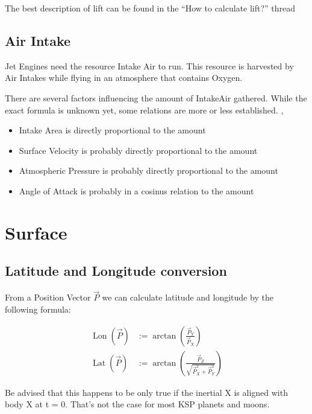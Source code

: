 \documentclass[11pt]{report}
\newcommand{\oa}[1]{\overrightarrow{#1}}
\newcommand{\Pos}{\oa{P}}
\DeclareMathOperator{\Lat}{Lat}
\DeclareMathOperator{\Lon}{Lon}
\begin{document}
The best description of  lift can be found in the ``How to
calculate lift?'' thread \cite{Lift}

\section{Air Intake}

Jet Engines need the resource Intake Air 
\cite{IntakeAir} to run. This resource is harvested by Air Intakes
\cite{Air Intakes} while flying in an atmosphere that contains Oxygen.

There are several factors influencing the amount of IntakeAir
gathered. While the exact formula is unknown yet, some relations are
more or less established. \cite{AirIntakeModel},
\cite{IntakesDifference}

\begin{itemize}
\item Intake Area is directly proportional to the amount
\item Surface Velocity is probably directly proportional to the amount
\item Atmospheric Pressure is probably directly proportional to the
  amount
\item Angle of Attack is probably in a cosinus relation to the amount
\end{itemize}

\chapter {Surface}

\section{Latitude and Longitude conversion}

From a Position Vector $\Pos$ we can calculate 
latitude and  longitude by the following formula:

\begin{align}
  \Lon(\Pos) &:= \arctan\left(\frac{\Pos_Y}{\Pos_X}\right)\\
  \Lat(\Pos) &:= \arctan\left(\frac{\Pos_Z}{\sqrt{\Pos_X^2+\Pos_Y^2}}\right)
\end{align}

Be advised that this happens to be only true if the inertial X is
aligned with body X at t = 0. That's not the case for most KSP planets
and moons. \cite{LatLongNote}
\end{document}
